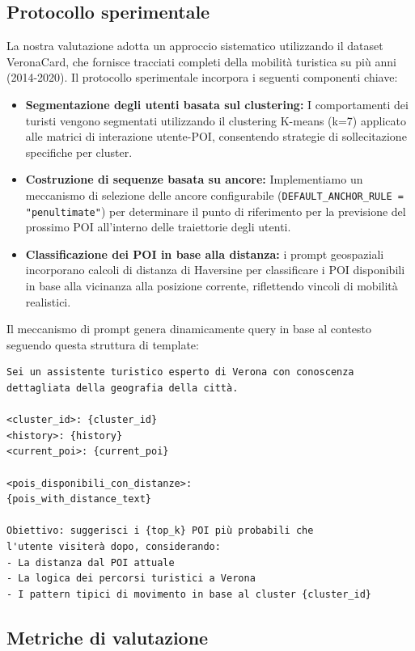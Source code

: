 \documentclass[12pt,a4paper]{article}
\begin{document}
\subsection{Protocollo sperimentale}

La nostra valutazione adotta un approccio sistematico utilizzando il dataset VeronaCard, che fornisce tracciati completi della mobilità turistica su più anni (2014-2020). Il protocollo sperimentale incorpora i seguenti componenti chiave:

\begin{itemize}
\item \textbf{Segmentazione degli utenti basata sul clustering:} I comportamenti dei turisti vengono segmentati utilizzando il clustering K-means (k=7) applicato alle matrici di interazione utente-POI, consentendo strategie di sollecitazione specifiche per cluster.
\item \textbf{Costruzione di sequenze basata su ancore:} Implementiamo un meccanismo di selezione delle ancore configurabile (\texttt{DEFAULT\_ANCHOR\_RULE = "penultimate"}) per determinare il punto di riferimento per la previsione del prossimo POI all'interno delle traiettorie degli utenti. \item \textbf{Classificazione dei POI in base alla distanza:} i prompt geospaziali incorporano calcoli di distanza di Haversine per classificare i POI disponibili in base alla vicinanza alla posizione corrente, riflettendo vincoli di mobilità realistici.
\end{itemize}

Il meccanismo di prompt genera dinamicamente query in base al contesto seguendo questa struttura di template:

\begin{lstlisting}[language=text, caption=Comprehensive Context Prompt Template]
Sei un assistente turistico esperto di Verona con conoscenza dettagliata della geografia della città.

<cluster_id>: {cluster_id}
<history>: {history}
<current_poi>: {current_poi}

<pois_disponibili_con_distanze>:
{pois_with_distance_text}

Obiettivo: suggerisci i {top_k} POI più probabili che 
l'utente visiterà dopo, considerando:
- La distanza dal POI attuale
- La logica dei percorsi turistici a Verona
- I pattern tipici di movimento in base al cluster {cluster_id}
\end{lstlisting}

\subsection{Metriche di valutazione}
\end{document}
